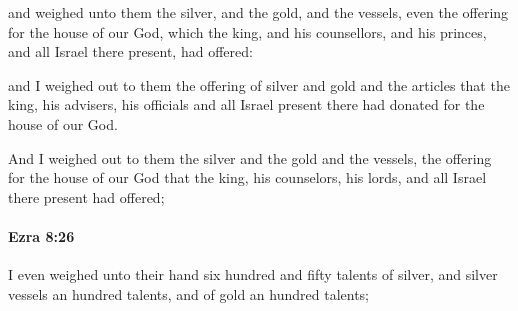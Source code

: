 			\begin{versebox}
					\item[BHS] 
					\item[LXX] 
					\item[ASV] and weighed unto them the silver, and the gold, and the vessels, even the offering for the house of our God, which the king, and his counsellors, and his princes, and all Israel there present, had offered:
					\item[NIV] and I weighed out to them the offering of silver and gold and the articles that the king, his advisers, his officials and all Israel present there had donated for the house of our God.
					\item[NRSV] And I weighed out to them the silver and the gold and the vessels, the offering for the house of our God that the king, his counselors, his lords, and all Israel there present had offered;
			\end{versebox}

		\paragraph{Ezra 8:26} %
			\label{EZRA-8-26}

			I even weighed unto their hand six hundred and fifty talents of silver, and silver vessels an hundred talents, and of gold an hundred talents;

